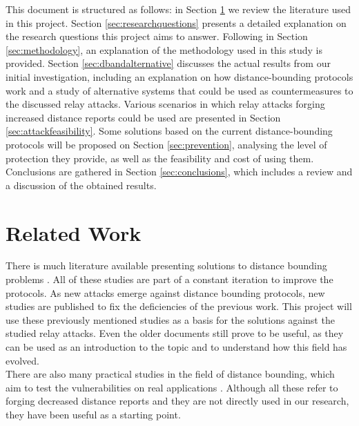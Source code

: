 \documentclass{article}
\begin{document}
This document is structured as follows: in Section \ref{sec:relatedwork} we review the literature used in this project. Section \ref{sec:researchquestions} presents a detailed explanation on the research questions this project aims to answer. Following in Section \ref{sec:methodology}, an explanation of the methodology used in this study is provided. Section \ref{sec:dbandalternative} discusses the actual results from our initial investigation, including an explanation on how distance-bounding protocols work and a study of alternative systems that could be used as countermeasures to the discussed relay attacks. Various scenarios in which relay attacks forging increased distance reports could be used are presented in Section \ref{sec:attackfeasibility}. Some solutions based on the current distance-bounding protocols will be proposed on Section \ref{sec:prevention}, analysing the level of protection they provide, as well as the feasibility and cost of using them. Conclusions are gathered in Section \ref{sec:conclusions}, which includes a review and a discussion of the obtained results.\\







\section{Related Work}
\label{sec:relatedwork}

There is much literature available presenting solutions to distance bounding problems \cite{brands1994distance, rasmussen2010realization, tu2007rfid}. All of these studies are part of a constant iteration to improve the protocols. As new attacks emerge against distance bounding protocols, new studies are published to fix the deficiencies of the previous work. This project will use these previously mentioned studies as a basis for the solutions against the studied relay attacks. Even the older documents still prove to be useful, as they can be used as an introduction to the topic and to understand how this field has evolved.\\

There are also many practical studies in the field of distance bounding, which aim to test the vulnerabilities on real applications \cite{vandenbreekel2014relay, francillon2011relay, francis2010practical, hancke2005practical, markantonakis2012practical}. Although all these refer to forging decreased distance reports and they are not directly used in our research, they have been useful as a starting point.\\
\end{document}
